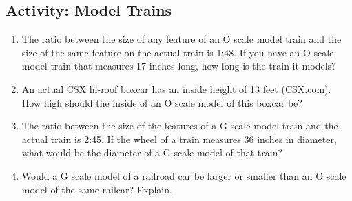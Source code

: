\wbnewpage
\subsection{Activity: Model Trains}
\begin{enumerate}
\item The ratio between the size of any feature of an O scale model train and the size of the same feature on the actual train is 1:48. If you have an O scale model train that measures 17 inches long, how long is the train it models?\wbvfill
\item An actual CSX hi-roof boxcar has an inside height of 13 feet (\href{https://www.csx.com/index.cfm/customers/resources/equipment/railroad-equipment/}{CSX.com}). How high should the inside of an O scale model of this boxcar be?\wbvfill
\item The ratio between the size of the features of a G scale model train and the actual train is 2:45. If the wheel of a train measures 36 inches in diameter, what would be the diameter of a G scale model of that train?\wbvfill
\item Would a G scale model of a railroad car be larger or smaller than an O scale model of the same railcar? Explain. \wbvfill
\end{enumerate}

\wbnewpage
